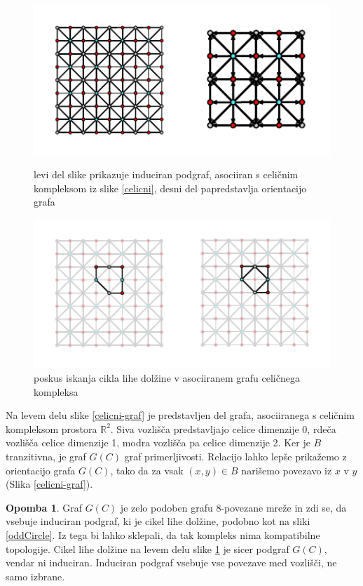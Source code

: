 \documentclass[a4paper, 12pt]{book}
\theoremstyle{definition}
\newtheorem{note}{Opomba}[section]
\theoremstyle{remark}
\begin{document}
\begin{figure}[p]
  \begin{center}
  \includegraphics[width=1\textwidth]{r2-cell-graph.pdf}
  \end{center}
  \caption{levi del slike prikazuje induciran podgraf, asociiran s celičnim kompleksom
  iz slike \ref{celicni}, desni del papredstavlja orientacijo grafa}
  \label{celicni-graf}

  \begin{center}
  \includegraphics[width=1\textwidth]{odd-circle-r2-cell.pdf}
  \end{center}
  \caption{poskus iskanja cikla lihe dolžine v asociiranem grafu celičnega kompleksa}
  \label{fail-celicni-graf}
\end{figure}
Na levem delu slike \ref{celicni-graf} je predstavljen del grafa, asociiranega s celičnim
kompleksom prostora $\mathbb{R}^2$. Siva vozlišča predstavljajo celice dimenzije 0, rdeča
vozlišča celice dimenzije 1, modra vozlišča pa celice dimenzije 2.
Ker je $B$ tranzitivna, je graf $G(C)$ graf primerljivosti. 
Relacijo lahko lepše prikažemo z orientacijo grafa $G(C)$, tako da za vsak
$(x,y) \in B$ narišemo povezavo iz $x$ v $y$ (Slika \ref{celicni-graf}).
\begin{note}
  Graf $G(C)$ je zelo podoben grafu 8-povezane mreže in zdi se, da vsebuje induciran
  podgraf, ki je cikel lihe dolžine, podobno kot na sliki \ref{oddCircle}. Iz tega
  bi lahko sklepali, da tak kompleks nima kompatibilne topologije. Cikel lihe dolžine
  na levem delu slike \ref{fail-celicni-graf} je sicer podgraf $G(C)$, vendar ni induciran.
  Induciran podgraf vsebuje vse povezave med vozlišči, ne samo izbrane.
\end{note}
\end{document}
